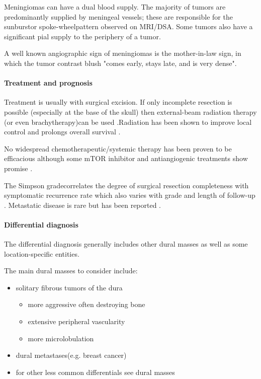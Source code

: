 Meningiomas can have a dual blood supply. The majority of tumors are predominantly supplied by meningeal vessels; these are responsible for the sunburstor spoke-wheelpattern observed on MRI/DSA. Some tumors also have a significant pial supply to the periphery of a tumor.

A well known angiographic sign of meningiomas is the mother-in-law sign, in which the tumor contrast blush "comes early, stays late, and is very dense".


\paragraph{Treatment and prognosis}

Treatment is usually with surgical excision. If only incomplete resection is possible (especially at the base of the skull) then external-beam radiation therapy (or even brachytherapy)can be used .Radiation has been shown to improve local control and prolongs overall survival .

No widespread chemotherapeutic/systemic therapy has been proven to be efficacious although some mTOR inhibitor and antiangiogenic treatments show promise .

The Simpson gradecorrelates the degree of surgical resection completeness with symptomatic recurrence rate which also varies with grade and length of follow-up . Metastatic disease is rare but has been reported .

\paragraph{Differential diagnosis}

The differential diagnosis generally includes other dural masses as well as some location-specific entities.

The main dural masses to consider include:

\begin{itemize}
	\item
	solitary fibrous tumors of the dura
	
	\begin{itemize}
		\item
		more aggressive often destroying bone
		\item
		extensive peripheral vascularity
		\item
		more microlobulation
	\end{itemize}
	\item
	dural metastases(e.g. breast cancer)
	\item
	for other less common differentials see dural masses
\end{itemize}

